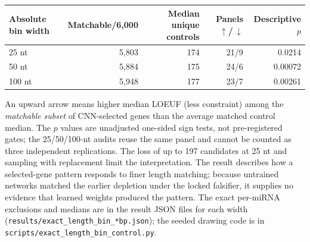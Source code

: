 \documentclass[11pt]{article}
\begin{document}
\begin{center}
\begin{tabular}{lrrrr}
Absolute bin width & Matchable/6{,}000 & Median unique controls & Panels $\uparrow$/\,$\downarrow$ & Descriptive $p$\\
\hline
25 nt & 5{,}803 & 174 & 21/9 & 0.0214\\
50 nt & 5{,}884 & 175 & 24/6 & 0.00072\\
100 nt & 5{,}948 & 177 & 23/7 & 0.00261\\
\end{tabular}
\end{center}
An upward arrow means higher median LOEUF (less constraint) among the
\emph{matchable subset} of CNN-selected genes than the average matched
control median. The $p$ values are unadjusted one-sided sign tests, not
pre-registered gates; the 25/50/100-nt audits reuse the same panel and
cannot be counted as three independent replications. The loss of up to 197
candidates at 25 nt and sampling with replacement limit the interpretation.
The result describes how a selected-gene pattern responds to finer length
matching; because untrained networks matched the earlier depletion under the
locked falsifier, it supplies no evidence that learned weights produced the
pattern. The exact per-miRNA exclusions and medians are in the result JSON files
for each width (\texttt{results/exact\_length\_bin\_*bp.json}); the
seeded drawing code is in \texttt{scripts/exact\_length\_bin\_control.py}.
\end{document}
